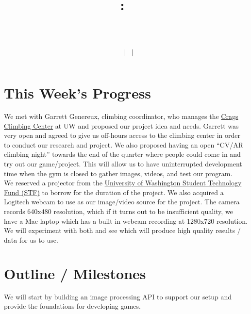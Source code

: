\documentclass[12pt]{article}
\title{
    \vspace{2in}
    \textmd{\textbf{\hmwkClass:\ \hmwkTitle}}\\
    \vspace{0.1in}\large{\textit{\hmwkClassInstructor\ \hmwkClassTime}}\\
    \author{\textbf{\hmwkAuthorName\ $\vert$ \hmwkAuthorCSE\ $\vert$ \hmwkAuthorId}}
}
\date{}
\begin{document}
\section{This Week's Progress}
\vspace{-3pt}
We met with Garrett Genereux, climbing coordinator, who manages the \href{https://www.washington.edu/ima/uwild/crags-climbing-center/}{Crags Climbing Center} at UW and proposed our project idea and needs. Garrett was very open and agreed to give us off-hours access to the climbing center in order to conduct our research and project. We also proposed having an open ``CV/AR climbing night'' towards the end of the quarter where people could come in and try out our game/project. This will allow us to have uninterrupted development time when the gym is closed to gather images, videos, and test our program.\\[-5pt]

We reserved a projector from the \href{http://www.cte.uw.edu/STFEquipment}{University of Washington Student Technology Fund (STF)} to borrow for the duration of the project. We also acquired a Logitech webcam to use as our image/video source for the project. The camera records 640x480 resolution, which if it turns out to be insufficient quality, we have a Mac laptop which has a built in webcam recording at 1280x720 resolution. We will experiment with both and see which will produce high quality results / data for us to use.
\vspace{-15pt}
\section{Outline / Milestones}
\vspace{-3pt}
We will start by building an image processing API to support our setup and provide the foundations for developing games.\\[-5pt]
\end{document}
